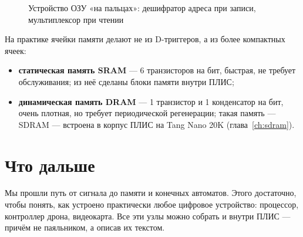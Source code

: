 \begin{figure}[H]
\centering
{}
\caption{Устройство ОЗУ «на пальцах»: дешифратор адреса при записи,
мультиплексор при чтении}
\label{fig:ram}
\end{figure}

На практике ячейки памяти делают не из D-триггеров, а из более компактных
ячеек:
\begin{itemize}
  \item \textbf{статическая память SRAM} --- 6 транзисторов на бит, быстрая,
        не требует обслуживания; из неё сделаны блоки памяти внутри ПЛИС;
  \item \textbf{динамическая память DRAM} --- 1 транзистор и 1 конденсатор на
        бит, очень плотная, но требует периодической регенерации; такая
        память --- SDRAM --- встроена в корпус ПЛИС на Tang Nano 20K
        (глава~\ref{ch:sdram}).
\end{itemize}

\section{Что дальше}

Мы прошли путь от сигнала до памяти и конечных автоматов. Этого достаточно,
чтобы понять, как устроено практически любое цифровое устройство: процессор,
контроллер дрона, видеокарта. Все эти узлы можно собрать и внутри ПЛИС ---
причём не паяльником, а описав их текстом.

